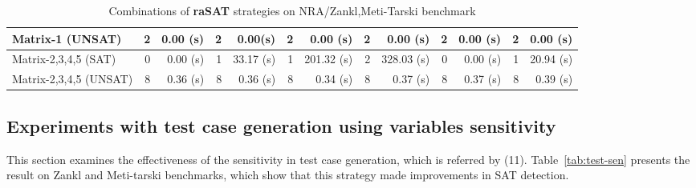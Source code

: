 \documentclass[runningheads,a4paper,oribibl]{llncs}
\begin{document}
\begin{table}[t]
{\begin{tabular}{ | l | r | r | r | r  | r | r | r | r | r | r |r | r |}
\\
\hline
 Matrix-1 (UNSAT) & 2 & 0.00 (s)& 2 & 0.00(s) & 2 & 0.00 (s)& 2 & 0.00 (s)& 2 & 0.00 (s)& 2 & 0.00 (s)
\\
\hline
 Matrix-2,3,4,5 (SAT) & 0 & 0.00 (s)& 1 & 33.17 (s)& 1 & 201.32 (s)& 2 & 328.03 (s)& 0 & 0.00 (s)& 1 & 20.94 (s)
\\
\hline
 Matrix-2,3,4,5 (UNSAT) & 8 & 0.36 (s)& 8 & 0.36 (s)& 8 & 0.34 (s)& 8 & 0.37 (s)& 8 & 0.37 (s)& 8 & 0.39 (s)
\\
\hline
\end{tabular}
}
\bigskip
{}
\medskip
\caption{Combinations of {\bf raSAT} strategies on NRA/Zankl,Meti-Tarski benchmark} 
\label{tab:rasat-experiments}
\end{table}


\subsection*{Experiments with test case generation using variables sensitivity}
This section examines the effectiveness of the sensitivity in test case generation, 
which is referred by (11).
Table~\ref{tab:test-sen} presents the result on Zankl and Meti-tarski
benchmarks, which show that this strategy made improvements in SAT detection. 
\end{document}
